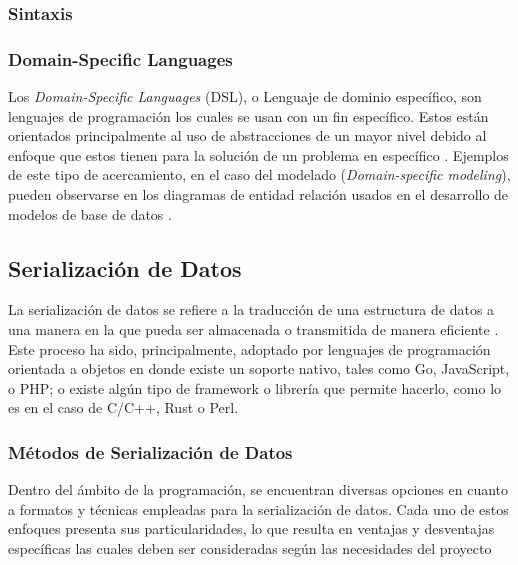\subsubsection{Sintaxis}


\subsubsection{Domain-Specific Languages} %



Los \textit{Domain-Specific Languages} (DSL), o Lenguaje de dominio específico, son lenguajes de programación los cuales se usan con un fin específico. Estos están orientados principalmente al uso de abstracciones de un mayor nivel debido al enfoque que estos tienen para la solución de un problema en específico \cite{Kelly2008}. Ejemplos de este tipo de acercamiento, en el caso del modelado (\textit{Domain-specific modeling}), pueden observarse en los diagramas de entidad relación usados en el desarrollo de modelos de base de datos \cite{Celikovic2014ADF}. 

\subsection{Serialización de Datos}

La serialización de datos se refiere a la traducción de una estructura de datos a una manera en la que pueda ser almacenada o transmitida de manera eficiente \cite{mozillaSerialization}. Este proceso ha sido, principalmente, adoptado por lenguajes de programación orientada a objetos en donde existe un soporte nativo, tales como Go, JavaScript, o PHP; o existe algún tipo de framework o librería que permite hacerlo, como lo es en el caso de C/C++, Rust o Perl.

\subsubsection{Métodos de Serialización de Datos}

Dentro del ámbito de la programación, se encuentran diversas opciones en cuanto a formatos y técnicas empleadas para la serialización de datos. Cada uno de estos enfoques presenta sus particularidades, lo que resulta en ventajas y desventajas específicas las cuales deben ser consideradas según las necesidades del proyecto  